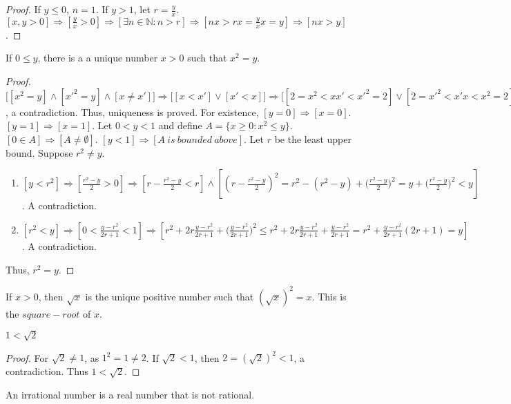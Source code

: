             \begin{proof}
            If $y\leq 0$, $n=1$. If $y>1$, let $r = \frac{y}{x}$. $[x,y>0]\Rightarrow [\frac{y}{x}>0]\Rightarrow [\exists n\in \mathbb{N}:n>r]\Rightarrow [nx > rx = \frac{y}{x}x = y]\Rightarrow[nx>y]$.
            \end{proof}
            \begin{theorem}
            If $0\leq y$, there is a a unique number $x>0$ such that $x^2 = y$.
            \end{theorem}
            \begin{proof}
            $\big[[x^2=y]\land [x'^2=y]\land [x\ne x']\big] \Rightarrow \big[[x<x']\lor[x'<x]\big] \Rightarrow \big[[2=x^2<xx'<x'^2=2]\lor[2=x'^2<x'x<x^2=2]\big]$, a contradiction. Thus, uniqueness is proved. For existence, $[y=0]\Rightarrow[x=0]$.$[y=1]\Rightarrow [x=1]$. Let $0 < y < 1$ and define $A = \{x\geq0:x^2 \leq y\}$. $[0\in A]\Rightarrow[A\ne \emptyset]$. $[y<1]\Rightarrow [A\ is\ bounded\ above]$. Let $r$ be the least upper bound. Suppose $r^2\ne y$.
            \begin{enumerate}
            \item $[y<r^2]\Rightarrow[\frac{r^2-y}{2}>0]\Rightarrow [r-\frac{r^2-y}{2}<r]\land[(r-\frac{r^2-y}{2})^2= r^2 - (r^2-y)+\big(\frac{r^2-y}{2}\big)^2 = y + \big(\frac{r^2-y}{2}\big)^2 < y]$. A contradiction.
            \item $[r^2 <y]\Rightarrow [0<\frac{y-r^2}{2r+1}<1]\Rightarrow [r^2 + 2r\frac{y-r^2}{2r+1}+\big(\frac{y-r^2}{2r+1}\big)^2\leq r^2 + 2r\frac{y-r^2}{2r+1}+\frac{y-r^2}{2r+1} = r^2+\frac{y-r^2}{2r+1}(2r+1)=y]$. A contradiction.
            \end{enumerate}
            Thus, $r^2 = y$.
            \end{proof}
            \begin{definition}
            If $x>0$, then $\sqrt{x}$ is the unique positive number such that $(\sqrt{x})^2 = x$. This is the $square-root$ of $x$.
            \end{definition}
            \begin{theorem}
            $1<\sqrt{2}$
            \end{theorem}
            \begin{proof}
                For $\sqrt{2} \ne 1$, as $1^2 = 1\ne 2$. If $\sqrt{2}<1$,
                then $2=(\sqrt{2})^2 <1$, a contradiction. Thus $1<\sqrt{2}$.
            \end{proof}
            \begin{definition}
                An irrational number is a real number that is not rational.
            \end{definition}
